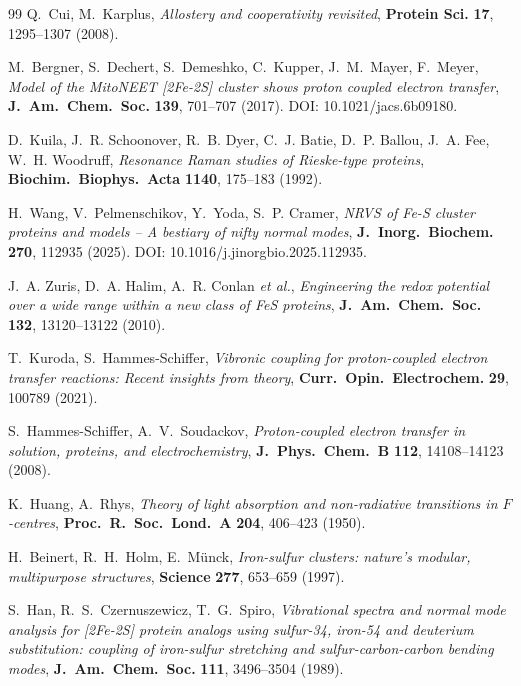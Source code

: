 \documentclass[11pt,a4paper,twoside]{article}
\theoremstyle{remark}
\begin{document}
\begin{thebibliography}{99}
Q.~Cui, M.~Karplus,
\emph{Allostery and cooperativity revisited},
\textbf{Protein Sci.} \textbf{17}, 1295--1307 (2008).

M.~Bergner, S.~Dechert, S.~Demeshko, C.~Kupper, J.~M.~Mayer, F.~Meyer,
\emph{Model of the {MitoNEET} {[}2Fe-2S{]} cluster shows proton coupled
electron transfer},
\textbf{J.\ Am.\ Chem.\ Soc.} \textbf{139}, 701--707 (2017).
DOI: 10.1021/jacs.6b09180.

D.~Kuila, J.~R. Schoonover, R.~B. Dyer, C.~J. Batie, D.~P. Ballou,
J.~A. Fee, W.~H. Woodruff,
\emph{Resonance {R}aman studies of {R}ieske-type proteins},
\textbf{Biochim.\ Biophys.\ Acta} \textbf{1140}, 175--183 (1992).

H.~Wang, V.~Pelmenschikov, Y.~Yoda, S.~P. Cramer,
\emph{NRVS of {Fe-S} cluster proteins and models -- A bestiary of
nifty normal modes},
\textbf{J.\ Inorg.\ Biochem.} \textbf{270}, 112935 (2025).
DOI: 10.1016/j.jinorgbio.2025.112935.

J.~A. Zuris, D.~A. Halim, A.~R. Conlan \emph{et al.},
\emph{Engineering the redox potential over a wide range within a
new class of FeS proteins},
\textbf{J.\ Am.\ Chem.\ Soc.} \textbf{132}, 13120--13122 (2010).

T.~Kuroda, S.~Hammes-Schiffer,
\emph{Vibronic coupling for proton-coupled electron transfer reactions:
Recent insights from theory},
\textbf{Curr.\ Opin.\ Electrochem.} \textbf{29}, 100789 (2021).


S.~Hammes-Schiffer, A.~V.~Soudackov,
\emph{Proton-coupled electron transfer in solution, proteins, and
electrochemistry},
\textbf{J.\ Phys.\ Chem.\ B} \textbf{112}, 14108--14123 (2008).

K.~Huang, A.~Rhys,
\emph{Theory of light absorption and non-radiative transitions in
$F$-centres},
\textbf{Proc.\ R.\ Soc.\ Lond.\ A} \textbf{204}, 406--423 (1950).

H.~Beinert, R.~H.~Holm, E.~M\"unck,
\emph{Iron-sulfur clusters: nature's modular, multipurpose structures},
\textbf{Science} \textbf{277}, 653--659 (1997).

S.~Han, R.~S.~Czernuszewicz, T.~G.~Spiro,
\emph{Vibrational spectra and normal mode analysis for {[}2Fe-2S{]}
protein analogs using sulfur-34, iron-54 and deuterium substitution:
coupling of iron-sulfur stretching and sulfur-carbon-carbon bending modes},
\textbf{J.\ Am.\ Chem.\ Soc.} \textbf{111}, 3496--3504 (1989).


\end{thebibliography}
\end{document}
